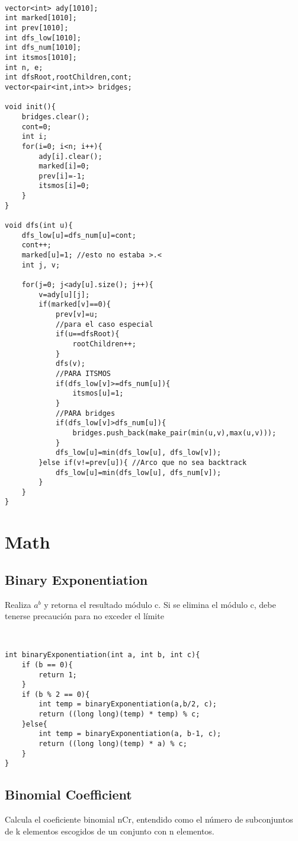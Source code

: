 \documentclass[11pt,letterpaper,twocolumn,twosided]{article}
\begin{document}
\begin{lstlisting}

vector<int> ady[1010];
int marked[1010];
int prev[1010];
int dfs_low[1010];
int dfs_num[1010];
int itsmos[1010];
int n, e;
int dfsRoot,rootChildren,cont;
vector<pair<int,int>> bridges;

void init(){
    bridges.clear();
    cont=0;
    int i;
    for(i=0; i<n; i++){
        ady[i].clear();
        marked[i]=0;
        prev[i]=-1;
        itsmos[i]=0;
    }
}

void dfs(int u){
    dfs_low[u]=dfs_num[u]=cont;
    cont++;
    marked[u]=1; //esto no estaba >.<
    int j, v;

    for(j=0; j<ady[u].size(); j++){
        v=ady[u][j];
        if(marked[v]==0){
            prev[v]=u;
            //para el caso especial 
            if(u==dfsRoot){
                rootChildren++;
            }
            dfs(v);
            //PARA ITSMOS
            if(dfs_low[v]>=dfs_num[u]){
                itsmos[u]=1;
            }
            //PARA bridges
            if(dfs_low[v]>dfs_num[u]){
                bridges.push_back(make_pair(min(u,v),max(u,v)));
            }
            dfs_low[u]=min(dfs_low[u], dfs_low[v]);
        }else if(v!=prev[u]){ //Arco que no sea backtrack
            dfs_low[u]=min(dfs_low[u], dfs_num[v]);
        }
    }
}
\end{lstlisting}

\section{Math}

\subsection{Binary Exponentiation}
Realiza $a^{b}$ y retorna el resultado m\'odulo c. Si se elimina el m\'odulo c, debe tenerse precauci\'on para no exceder el l\'imite

\begin{lstlisting}


int binaryExponentiation(int a, int b, int c){
    if (b == 0){
    	return 1;
    } 
    if (b % 2 == 0){
        int temp = binaryExponentiation(a,b/2, c);
        return ((long long)(temp) * temp) % c;
    }else{
        int temp = binaryExponentiation(a, b-1, c);
        return ((long long)(temp) * a) % c;
    }
}
\end{lstlisting}

\subsection{Binomial Coefficient}
Calcula el coeficiente binomial nCr, entendido como el n\'umero de subconjuntos de k elementos escogidos de un conjunto con n elementos.
\end{document}
